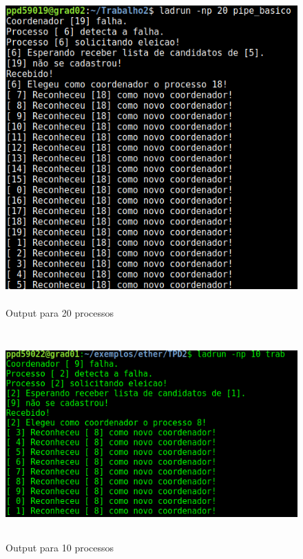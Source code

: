 \documentclass{article}
\begin{document}
\begin{figure}[H]
            \centering
            \includegraphics[width=13cm, height=12cm]{exemplo_saida.png}
            \caption{Output para 20 processos}
\end{figure}

\begin{figure}[H]
            \centering
            \includegraphics[width=13cm, height=8cm]{ex_10.png}
            \caption{Output para 10 processos}
\end{figure}
\end{document}
